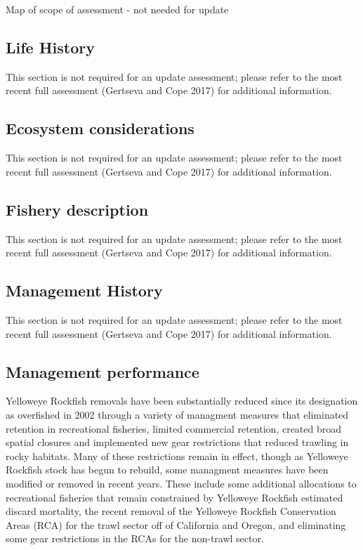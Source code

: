 \documentclass[
]{scrartcl}
\begin{document}
Map of scope of assessment - not needed for update

\subsection{Life History}\label{life-history}

This section is not required for an update assessment; please refer to
the most recent full assessment (Gertseva and Cope 2017) for additional
information.

\subsection{Ecosystem considerations}\label{ecosystem-considerations}

This section is not required for an update assessment; please refer to
the most recent full assessment (Gertseva and Cope 2017) for additional
information.

\subsection{Fishery description}\label{fishery-description}

This section is not required for an update assessment; please refer to
the most recent full assessment (Gertseva and Cope 2017) for additional
information.

\subsection{Management History}\label{management-history}

This section is not required for an update assessment; please refer to
the most recent full assessment (Gertseva and Cope 2017) for additional
information.

\subsection{Management performance}\label{management-performance}

Yelloweye Rockfish removals have been substantially reduced since its
designation as overfished in 2002 through a variety of managment
measures that eliminated retention in recreational fisheries, limited
commercial retention, created broad spatial closures and implemented new
gear restrictions that reduced trawling in rocky habitats. Many of these
restrictions remain in effect, though as Yelloweye Rockfish stock has
begun to rebuild, some managment measures have been modified or removed
in recent years. These include some additional allocations to
recreational fisheries that remain constrained by Yelloweye Rockfish
estimated discard mortality, the recent removal of the Yelloweye
Rockfish Conservation Areas (RCA) for the trawl sector off of California
and Oregon, and eliminating some gear restrictions in the RCAs for the
non-trawl sector.
\end{document}
